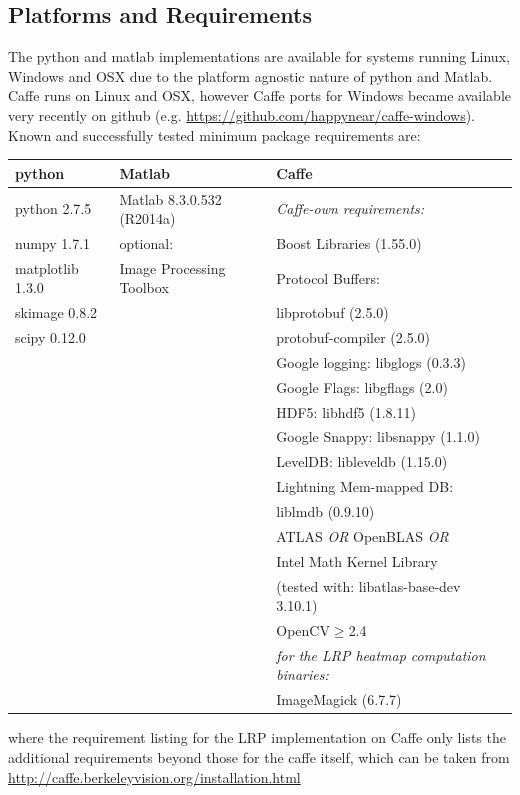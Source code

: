 \documentclass[a4wide]{article}
\begin{document}
\subsection*{Platforms and Requirements}
The python and matlab implementations are available for systems running Linux, Windows and OSX due to the platform agnostic nature of python and Matlab. Caffe runs on Linux and OSX, however Caffe ports for Windows became available very recently on github (e.g. \url{https://github.com/happynear/caffe-windows}). Known and successfully tested minimum package requirements are:
\begin{center}
\begin{tabular}{|l|l|l|}
\hline
\textbf{python} & \textbf{Matlab} & \textbf{Caffe} \\
\hline
python 2.7.5	& Matlab 8.3.0.532 (R2014a) & \emph{Caffe-own requirements:}   \\
numpy 1.7.1	   & optional:  & Boost Libraries (1.55.0) \\
matplotlib 1.3.0	   &\hspace{5mm} Image Processing Toolbox&  Protocol Buffers:  \\
skimage 0.8.2	   & &  \hspace{5mm} libprotobuf (2.5.0)\\
scipy 0.12.0			& & \hspace{5mm} protobuf-compiler (2.5.0)  \\
			& & Google logging: libglogs (0.3.3)\\
	   & &  Google Flags: libgflags (2.0)\\
 & &  HDF5: libhdf5 (1.8.11)  \\
		   & & Google Snappy: libsnappy (1.1.0)\\
 & & LevelDB: libleveldb (1.15.0)\\
 		   & & Lightning Mem-mapped DB: \\
 & & \hspace{5mm}  liblmdb (0.9.10) \\
 & &  ATLAS \emph{OR} OpenBLAS \emph{OR} \\
	& & Intel Math Kernel Library \\
	& & (tested with: libatlas-base-dev 3.10.1) \\
 & &  OpenCV$\ge$2.4   \\\cline{3-3}
& &   \emph{for the LRP heatmap computation binaries:}\\
 & & ImageMagick (6.7.7) \\
\hline
\end{tabular}
\end{center}
where the requirement listing for the LRP implementation on Caffe only lists the additional requirements beyond those for the caffe itself, which can be taken from \url{http://caffe.berkeleyvision.org/installation.html}
\end{document}
